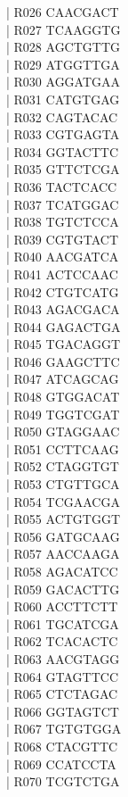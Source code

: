 \documentclass[titlepage,10pt,a4paper,uplatex]{jsbook}
\newenvironment{content}{\begin{shaded}\vspace{-1em}\raggedright\ttfamily\footnotesize\setlength{\baselineskip}{1.4em}}{\end{shaded}\vspace{-1em}}
\begin{document}
\begin{content}
| R026	CAACGACT\\
| R027	TCAAGGTG\\
| R028	AGCTGTTG\\
| R029	ATGGTTGA\\
| R030	AGGATGAA\\
| R031	CATGTGAG\\
| R032	CAGTACAC\\
| R033	CGTGAGTA\\
| R034	GGTACTTC\\
| R035	GTTCTCGA\\
| R036	TACTCACC\\
| R037	TCATGGAC\\
| R038	TGTCTCCA\\
| R039	CGTGTACT\\
| R040	AACGATCA\\
| R041	ACTCCAAC\\
| R042	CTGTCATG\\
| R043	AGACGACA\\
| R044	GAGACTGA\\
| R045	TGACAGGT\\
| R046	GAAGCTTC\\
| R047	ATCAGCAG\\
| R048	GTGGACAT\\
| R049	TGGTCGAT\\
| R050	GTAGGAAC\\
| R051	CCTTCAAG\\
| R052	CTAGGTGT\\
| R053	CTGTTGCA\\
| R054	TCGAACGA\\
| R055	ACTGTGGT\\
| R056	GATGCAAG\\
| R057	AACCAAGA\\
| R058	AGACATCC\\
| R059	GACACTTG\\
| R060	ACCTTCTT\\
| R061	TGCATCGA\\
| R062	TCACACTC\\
| R063	AACGTAGG\\
| R064	GTAGTTCC\\
| R065	CTCTAGAC\\
| R066	GGTAGTCT\\
| R067	TGTGTGGA\\
| R068	CTACGTTC\\
| R069	CCATCCTA\\
| R070	TCGTCTGA\\

\end{content}
\end{document}
